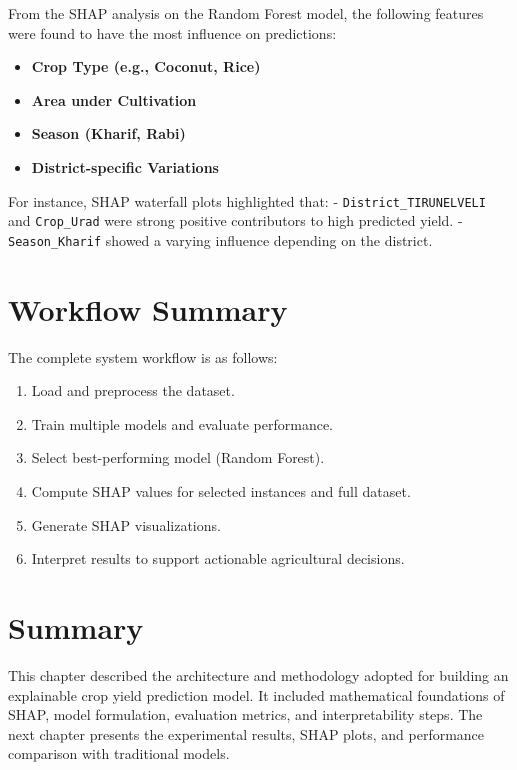 \documentclass[a4paper,11pt,oneside]{book}
\begin{document}
From the SHAP analysis on the Random Forest model, the following features were found to have the most influence on predictions:

\begin{itemize}
    \item \textbf{Crop Type (e.g., Coconut, Rice)}
    \item \textbf{Area under Cultivation}
    \item \textbf{Season (Kharif, Rabi)}
    \item \textbf{District-specific Variations}
\end{itemize}

For instance, SHAP waterfall plots highlighted that:
- \texttt{District\_TIRUNELVELI} and \texttt{Crop\_Urad} were strong positive contributors to high predicted yield.
- \texttt{Season\_Kharif} showed a varying influence depending on the district.

\section{Workflow Summary}

The complete system workflow is as follows:

\begin{enumerate}
    \item Load and preprocess the dataset.
    \item Train multiple models and evaluate performance.
    \item Select best-performing model (Random Forest).
    \item Compute SHAP values for selected instances and full dataset.
    \item Generate SHAP visualizations.
    \item Interpret results to support actionable agricultural decisions.
\end{enumerate}

\section{Summary}

This chapter described the architecture and methodology adopted for building an explainable crop yield prediction model. It included mathematical foundations of SHAP, model formulation, evaluation metrics, and interpretability steps. The next chapter presents the experimental results, SHAP plots, and performance comparison with traditional models.
\end{document}
